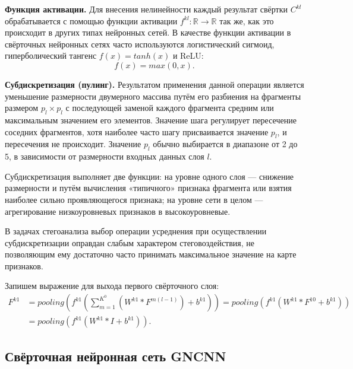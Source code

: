 \textbf{Функция активации.} Для внесения нелинейности каждый результат свёртки $ C^{kl} $ обрабатывается с помощью функции активации $ f^{kl}: \mathbb{R} \to \mathbb{R} $ так же, как это происходит в других типах нейронных сетей. В качестве функции активации в свёрточных нейронных сетях часто используются логистический сигмоид, гиперболический тангенс $ f(x) = tanh(x) $ и ReLU:
\begin{equation*}
f(x) = max(0, x).
\end{equation*}

\textbf{Субдискретизация (пулинг).} Результатом применения данной операции является уменьшение размерности двумерного массива путём его разбиения на фрагменты размером $ p_l \times p_l $ с последующей заменой каждого фрагмента средним или максимальным значением его элементов. Значение шага регулирует пересечение соседних фрагментов, хотя наиболее часто шагу присваивается значение $ p_l $, и пересечения не происходит. Значение $ p_l $ обычно выбирается в диапазоне от 2 до 5, в зависимости от размерности входных данных слоя $ l $.

Субдискретизация выполняет две функции: на уровне одного слоя --- снижение размерности и путём вычисления «типичного» признака фрагмента или взятия наиболее сильно проявляющегося признака; на уровне сети в целом --- агрегирование низкоуровневых признаков в высокоуровневые.

В задачах стегоанализа выбор операции усреднения при осуществлении субдискретизации оправдан слабым характером стеговоздействия, не позволяющим ему достаточно часто принимать максимальное значение на карте признаков.

Запишем выражение для выхода первого свёрточного слоя:
\begin{align*}
F^{k1} &= pooling(f^{k1}(\sum_{m = 1}^{K^0}(W^{k1} * F^{m(l - 1)}) + b^{k1})) = pooling(f^{k1}(W^{k1}*F^{10} + b^{k1})) \\
&= pooling(f^{k1}(W^{k1} * I + b^{k1})).
\end{align*}

\subsection{Свёрточная нейронная сеть GNCNN}

